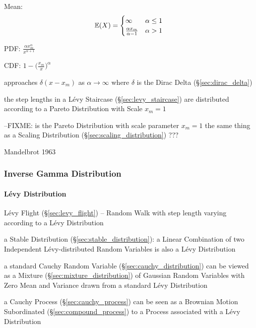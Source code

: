 Mean:
\[
  \mathbb{E}(X) = \begin{cases}
    \infty                      & \alpha \leq 1 \\
    \frac{\alpha x_m}{\alpha-1} & \alpha > 1 \\
  \end{cases}
\]

PDF: $\frac{\alpha x_m^\alpha}{x^{\alpha+1}}$

CDF: $1 - \Big(\frac{x_m}{x}\Big)^\alpha$

approaches $\delta(x - x_m)$ as $\alpha \to \infty$ where $\delta$ is the Dirac
Delta (\S\ref{sec:dirac_delta})

the step lengths in a L\'evy Staircase (\S\ref{sec:levy_staircase}) are
distributed according to a Pareto Distribution with Scale $x_m = 1$

--FIXME: is the Pareto Distribution with scale parameter $x_m = 1$ the same
thing as a Scaling Distribution (\S\ref{sec:scaling_distribution}) ???

Mandelbrot 1963



\subsubsection{Inverse Gamma Distribution}\label{sec:inverse_gamma}




\paragraph{L\'evy Distribution}\label{sec:levy_distribution}\hfill

L\'evy Flight (\S\ref{sec:levy_flight}) -- Random Walk with step length varying
according to a L\'evy Distribution

a Stable Distribution (\S\ref{sec:stable_distribution}): a Linear Combination of
two Independent L\'evy-distributed Random Variables is also a L\'evy
Distribution

a standard Cauchy Random Variable (\S\ref{sec:cauchy_distribution}) can be
viewed as a Mixture (\S\ref{sec:mixture_distribution}) of Gaussian Random
Variables with Zero Mean and Variance drawn from a standard L\'evy Distribution

a Cauchy Process (\S\ref{sec:cauchy_process}) can be seen as a Brownian Motion
Subordinated (\S\ref{sec:compound_process}) to a Process associated with a L\'evy
Distribution



